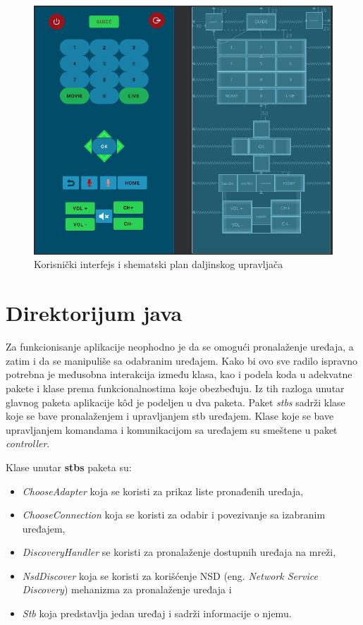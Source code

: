 \documentclass[implementacija.tex]{subfiles}
\begin{document}
\begin{figure}[!ht]
  \centering
  \label{fig:remoteScena}
  \includegraphics[width=\textwidth]{Implementacija/snimci_ekrana/remote_control_scene.png}
  \caption{Korisnički interfejs i shematski plan daljinskog upravljača}
\end{figure}


\section{Direktorijum java}
Za funkcionisanje aplikacije neophodno je da se omogući pronalaženje uređaja, a zatim i da se manipuliše sa odabranim uređajem. Kako bi ovo sve radilo ispravno potrebna je međusobna interakcija između klasa, kao i podela koda u adekvatne pakete i klase prema funkcionalnostima koje obezbeđuju. Iz tih razloga unutar glavnog paketa aplikacije k\^{o}d je podeljen u dva paketa. Paket \textit{stbs} sadrži klase koje se bave pronalaženjem i upravljanjem stb uređajem. Klase koje se bave upravljanjem komandama i komunikacijom sa uređajem su smeštene u paket \textit{controller}. 

Klase unutar \textbf{stbs} paketa su:
\begin{itemize}
\item \textit{ChooseAdapter} koja se koristi za prikaz liste pronađenih uređaja,
\item \textit{ChooseConnection} koja se koristi za odabir i povezivanje sa izabranim uređajem,
\item \textit{DiscoveryHandler} se koristi za pronalaženje dostupnih uređaja na mreži,
\item \textit{NsdDiscover} koja se koristi za korišćenje NSD (eng. \textit{Network Service Discovery}) mehanizma za pronalaženje uređaja i
\item \textit{Stb} koja predstavlja jedan uređaj i sadrži informacije o njemu.
\end{itemize}
\end{document}
